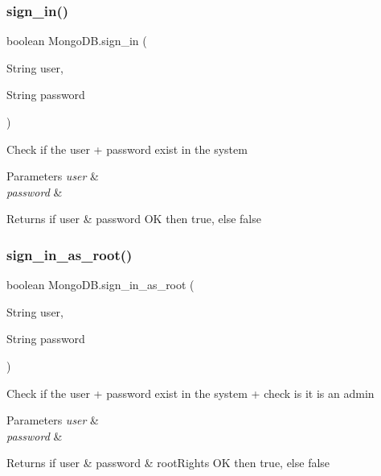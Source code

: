 \mbox{\label{class_mongo_d_b_a672df0039a1fcd302bd399089bb7fe28}} 
\subsubsection{\texorpdfstring{sign\+\_\+in()}{sign\_in()}}
{\footnotesize\ttfamily boolean Mongo\+D\+B.\+sign\+\_\+in (\begin{DoxyParamCaption}\item[{String}]{user,  }\item[{String}]{password }\end{DoxyParamCaption})}

Check if the user + password exist in the system 
\begin{DoxyParams}{Parameters}
{\em user} & \\
\hline
{\em password} & \\
\hline
\end{DoxyParams}
\begin{DoxyReturn}{Returns}
if user \& password OK then true, else false 
\end{DoxyReturn}
\mbox{\label{class_mongo_d_b_afa13d12f56548fcf6c5ca12ec66bc73c}} 
\subsubsection{\texorpdfstring{sign\+\_\+in\+\_\+as\+\_\+root()}{sign\_in\_as\_root()}}
{\footnotesize\ttfamily boolean Mongo\+D\+B.\+sign\+\_\+in\+\_\+as\+\_\+root (\begin{DoxyParamCaption}\item[{String}]{user,  }\item[{String}]{password }\end{DoxyParamCaption})}

Check if the user + password exist in the system + check is it is an admin 
\begin{DoxyParams}{Parameters}
{\em user} & \\
\hline
{\em password} & \\
\hline
\end{DoxyParams}
\begin{DoxyReturn}{Returns}
if user \& password \& root\+Rights OK then true, else false 
\end{DoxyReturn}
\mbox{\label{class_mongo_d_b_a9c69be7c091bffc9d1950e118fdb2251}} 
